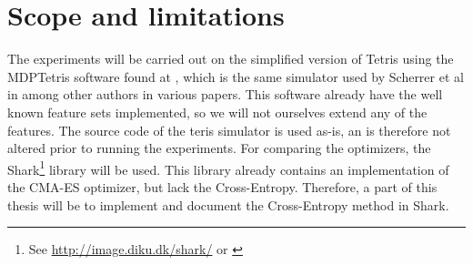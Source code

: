 \section{Scope and limitations \label{section:scope}}


The experiments will be carried out on the simplified version of
Tetris using the MDPTetris software found at \cite{mdptetris},
which is the same simulator used by Scherrer et al in \cite{scherrer2009:b} among 
other authors in various papers.
This software already have the well known feature sets
implemented, so we will not ourselves extend any of the features.
The source code of the teris simulator is used as-is, an is therefore 
not altered prior to running the experiments. 
For comparing the optimizers, the Shark\footnote{See \url{http://image.diku.dk/shark/} or \cite{shark08}
} library will be used. This library already contains an
implementation of the CMA-ES optimizer, but lack the 
Cross-Entropy. Therefore, a part of this thesis will
be to implement and document the Cross-Entropy method in Shark.





